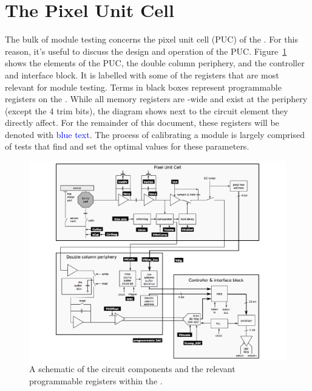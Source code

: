 \section{The Pixel Unit Cell}
\label{s:puc}

The bulk of module testing concerns the pixel unit cell (PUC) of the \roc.  
For this reason, it's useful to discuss the design and operation of the PUC.  
Figure~\ref{fig:puc} shows the elements of the PUC, the double column periphery, and the controller and interface block.  
It is labelled with some of the \dac registers that are most relevant for module testing.  
Terms in black boxes represent programmable \dac registers on the \roc.
While all \dac memory registers are \roc-wide and exist at the periphery (except the 4 trim bits), 
the diagram shows \dacs next to the circuit element they directly affect.
For the remainder of this document, these \dac registers will be denoted with \textcolor{blue}{blue text}.  
The process of calibrating a module is largely comprised of tests that find and set the optimal values for these parameters.  

\begin{figure}[hbtp]
\begin{center}
\includegraphics[width=\textwidth]{figures/ROC_dac_schematic.pdf}
\caption{A schematic of the circuit components and the relevant programmable registers within the \roc.}
\label{fig:puc}
\end{center}
\end{figure}

